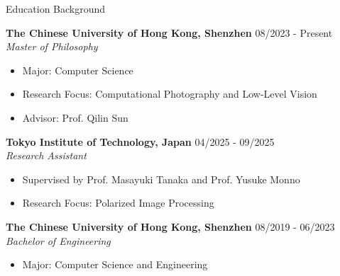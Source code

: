 \documentclass{resume} %
\begin{document}

\begin{rSection}{Education Background}

\setlength{\parskip}{2pt}

{\bf The Chinese University of Hong Kong, Shenzhen} \hfill {08/2023 - Present}\\
\textit{Master of Philosophy}
\begin{itemize}
    \item Major: Computer Science
    \item Research Focus: Computational Photography and Low-Level Vision
    \item Advisor: Prof. Qilin Sun
\end{itemize}

{\bf Tokyo Institute of Technology, Japan} \hfill {04/2025 - 09/2025}\\
\textit{Research Assistant}
\begin{itemize}
    \item Supervised by Prof. Masayuki Tanaka and Prof. Yusuke Monno
    \item Research Focus: Polarized Image Processing
\end{itemize}

{\bf The Chinese University of Hong Kong, Shenzhen} \hfill {08/2019 - 06/2023}\\
\textit{Bachelor of Engineering}
\begin{itemize}
    \item Major: Computer Science and Engineering
\end{itemize}

\end{rSection}
\end{document}
